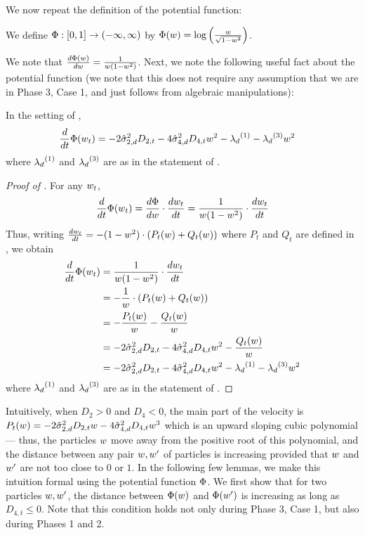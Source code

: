 We now repeat the definition of the potential function:

\begin{definition} \label{def:potential_function}
We define $\Phi : [0, 1] \to (-\infty, \infty)$ by $\Phi(w) = \log\Big(\frac{w}{\sqrt{1 - w^2}}\Big)$.
\end{definition}

We note that $\frac{d\Phi(w)}{dw} = \frac{1}{w(1 - w^2)}$. Next, we note the following useful fact about the potential function (we note that this does not require any assumption that we are in Phase 3, Case 1, and just follows from algebraic manipulations):

\begin{lemma} \label{lemma:potential_time_derivative}
In the setting of ,
\begin{align}
\frac{d}{dt} \Phi(w_t)
& = -2 \hat{\sigma}_{2, d}^2 D_{2, t} - 4 \hat{\sigma}_{4, d}^2 D_{4, t} w^2 - {\lambda_d}^{(1)} - {\lambda_d}^{(3)} w^2
\end{align}
where ${\lambda_d}^{(1)}$ and ${\lambda_d}^{(3)}$ are as in the statement of .
\end{lemma}
\begin{proof}[Proof of ]
For any $w_t$,
\begin{align}
\frac{d}{dt} \Phi(w_t) = \frac{d\Phi}{dw} \cdot \frac{dw_t}{dt} = \frac{1}{w (1 - w^2)} \cdot \frac{dw_t}{dt}
\end{align}
Thus, writing $\frac{dw_t}{dt} = -(1 - w^2) \cdot (P_t(w) + Q_t(w))$ where $P_t$ and $Q_t$ are defined in , we obtain
\begin{align}
\frac{d}{dt} \Phi(w_t)
& = \frac{1}{w(1 - w^2)} \cdot \frac{dw_t}{dt} \\
& = -\frac{1}{w} \cdot (P_t(w) + Q_t(w)) \\
& = -\frac{P_t(w)}{w} - \frac{Q_t(w)}{w} \\
& = -2\hat{\sigma}_{2, d}^2 D_{2, t} - 4 \hat{\sigma}_{4, d}^2 D_{4, t} w^2  - \frac{Q_t(w)}{w} \\
& = -2\hat{\sigma}_{2, d}^2 D_{2, t} - 4 \hat{\sigma}_{4, d}^2 D_{4, t} w^2  - {\lambda_d}^{(1)} - {\lambda_d}^{(3)} w^2
\end{align}
where ${\lambda_d}^{(1)}$ and ${\lambda_d}^{(3)}$ are as in the statement of .
\end{proof}

Intuitively, when $D_2 > 0$ and $D_4 < 0$, the main part of the velocity is $P_t(w) = -2 \hat{\sigma}_{2, d}^2 D_{2, t} w - 4 \hat{\sigma}_{4, d}^2 D_{4, t} w^3$ which is an upward sloping cubic polynomial --- thus, the particles $w$ move away from the positive root of this polynomial, and the distance between any pair $w, w'$ of particles is increasing provided that $w$ and $w'$ are not too close to $0$ or $1$. In the following few lemmas, we make this intuition formal using the potential function $\Phi$. We first show that for two particles $w, w'$, the distance between $\Phi(w)$ and $\Phi(w')$ is increasing as long as $D_{4, t} \leq 0$. Note that this condition holds not only during Phase 3, Case 1, but also during Phases 1 and 2.

